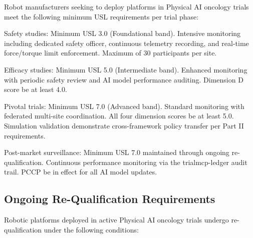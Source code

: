 \documentclass[11pt,letterpaper]{article}
\begin{document}
Robot manufacturers seeking to deploy platforms in Physical AI oncology trials \SHALL{} meet the following minimum USL requirements per trial phase:

\begin{description}[leftmargin=2.5cm, style=sameline]
  \item[Phase I] Safety studies: Minimum USL 3.0 (Foundational band). Intensive monitoring \REQUIRED{} including dedicated safety officer, continuous telemetry recording, and real-time force/torque limit enforcement. Maximum of 30 participants per site.

  \item[Phase II] Efficacy studies: Minimum USL 5.0 (Intermediate band). Enhanced monitoring \REQUIRED{} with periodic safety review and AI model performance auditing. Dimension D score \SHALL{} be at least 4.0.

  \item[Phase III] Pivotal trials: Minimum USL 7.0 (Advanced band). Standard monitoring with federated multi-site coordination. All four dimension scores \SHALL{} be at least 5.0. Simulation validation \SHALL{} demonstrate cross-framework policy transfer per Part II requirements.

  \item[Phase IV] Post-market surveillance: Minimum USL 7.0 maintained through ongoing re-qualification. Continuous performance monitoring via the trialmcp-ledger audit trail. PCCP \SHALL{} be in effect for all AI model updates.
\end{description}

\subsection{Ongoing Re-Qualification Requirements}

Robotic platforms deployed in active Physical AI oncology trials \SHALL{} undergo re-qualification under the following conditions:
\end{document}
